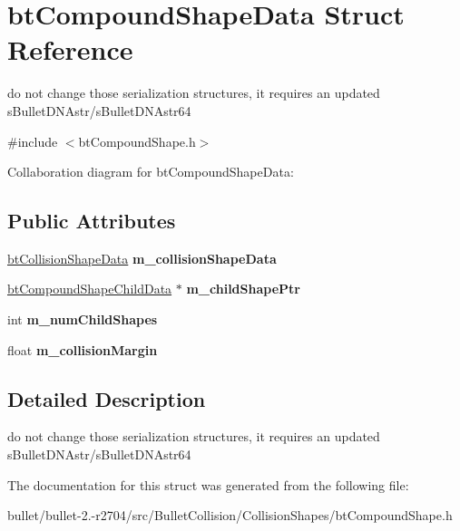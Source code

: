 \hypertarget{structbt_compound_shape_data}{\section{bt\+Compound\+Shape\+Data Struct Reference}
\label{structbt_compound_shape_data}
}


do not change those serialization structures, it requires an updated s\+Bullet\+D\+N\+Astr/s\+Bullet\+D\+N\+Astr64  




{\ttfamily \#include $<$bt\+Compound\+Shape.\+h$>$}



Collaboration diagram for bt\+Compound\+Shape\+Data\+:
\subsection*{Public Attributes}
\begin{DoxyCompactItemize}
\item 
\hypertarget{structbt_compound_shape_data_a8ad17d74bf8a782b81387b70b0d24d62}{\hyperlink{structbt_collision_shape_data}{bt\+Collision\+Shape\+Data} {\bfseries m\+\_\+collision\+Shape\+Data}}\label{structbt_compound_shape_data_a8ad17d74bf8a782b81387b70b0d24d62}

\item 
\hypertarget{structbt_compound_shape_data_a302e15c37c114251cf38ecc7f6fd85f4}{\hyperlink{structbt_compound_shape_child_data}{bt\+Compound\+Shape\+Child\+Data} $\ast$ {\bfseries m\+\_\+child\+Shape\+Ptr}}\label{structbt_compound_shape_data_a302e15c37c114251cf38ecc7f6fd85f4}

\item 
\hypertarget{structbt_compound_shape_data_a363722a976d98e3090af2b59b5d74d90}{int {\bfseries m\+\_\+num\+Child\+Shapes}}\label{structbt_compound_shape_data_a363722a976d98e3090af2b59b5d74d90}

\item 
\hypertarget{structbt_compound_shape_data_aaa3fbc2ba9a89901f72a354e6256805b}{float {\bfseries m\+\_\+collision\+Margin}}\label{structbt_compound_shape_data_aaa3fbc2ba9a89901f72a354e6256805b}

\end{DoxyCompactItemize}


\subsection{Detailed Description}
do not change those serialization structures, it requires an updated s\+Bullet\+D\+N\+Astr/s\+Bullet\+D\+N\+Astr64 

The documentation for this struct was generated from the following file\+:\begin{DoxyCompactItemize}
\item 
bullet/bullet-\/2.-\/r2704/src/\+Bullet\+Collision/\+Collision\+Shapes/bt\+Compound\+Shape.\+h\end{DoxyCompactItemize}
